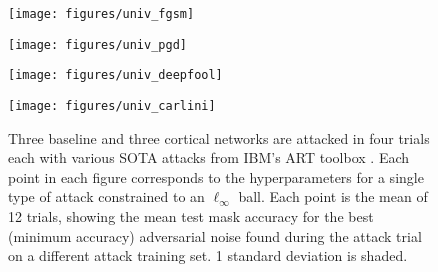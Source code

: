 \documentclass{article}
\begin{document}
\begin{figure}[t!]
	
	\begin{minipage}[b]{.24\linewidth}
		\centering
		\centerline{\texttt{[image: figures/univ\_fgsm]}}
	\end{minipage}
	\hfill
	\begin{minipage}[b]{0.24\linewidth}
		\centering
		\centerline{\texttt{[image: figures/univ\_pgd]}}
	\end{minipage}
	\hfill
	\begin{minipage}[b]{0.24\linewidth}
	\centering
	\centerline{\texttt{[image: figures/univ\_deepfool]}}
	\end{minipage}
	\hfill
	\begin{minipage}[b]{0.24\linewidth}
	\centering
	\centerline{\texttt{[image: figures/univ\_carlini]}}
	\end{minipage}
	\caption{
		Three baseline and three cortical networks are attacked in four trials each with various SOTA attacks from IBM's ART toolbox \cite{ibmart}.
	Each point in each figure corresponds to the hyperparameters for a single type of attack constrained to an $\ell_\infty$ ball. %
	Each point is the mean of 12 trials, showing the mean test mask accuracy for the best (minimum accuracy) adversarial noise found during the attack trial on a different attack training set.  1 standard deviation is shaded.}
	\label{fig:defense1}
\end{figure}
\end{document}
